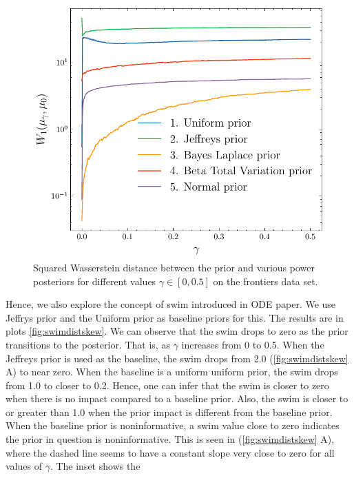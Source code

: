 \documentclass[12pt]{article}
\newcommand{\jsh}[1]{\todo[inline,color=green!20, caption={2do}]{\textbf{Jack:}\\#1}}
\begin{document}
\begin{figure}
\begin{center}
\includegraphics{imgs/wasser_distskew.pdf}
\end{center}
\caption{Squared Wasserstein distance between the prior and various power
posteriors for different values $\gamma \in [0, 0.5]$ on the frontiers
data set.}\label{fig:skew_diff_priors}
\end{figure}
\jsh{Remove sWIM - confuses matters?}
Hence, we also explore the concept of \gls{swim} introduced in ODE paper. We
use Jeffrys prior and the Uniform prior as baseline priors for this. The
results are in plots \cref{fig:swimdistskew}. We can observe that the
\gls{swim} drops to zero as the prior transitions to the posterior. That is, as
$\gamma$ increases from 0 to 0.5. When the Jeffreys prior is used as the
baseline, the \gls{swim}  drops from 2.0 (\cref{fig:swimdistskew} A) to near
zero. When the baseline is a uniform uniform prior, the \gls{swim} drops from
1.0 to closer to 0.2. Hence, one can infer that the \gls{swim} is closer to
zero when there is no impact compared to a baseline prior. Also, the \gls{swim}
is closer to or greater than 1.0 when the prior impact is different from the
baseline prior. When the baseline prior is noninformative, a \gls{swim} value
close to zero indicates the prior in question is noninformative. This is seen
in (\cref{fig:swimdistskew} A), where the dashed line seems to have a constant
slope very close to zero for all values of $\gamma$. The inset shows the
\end{document}
